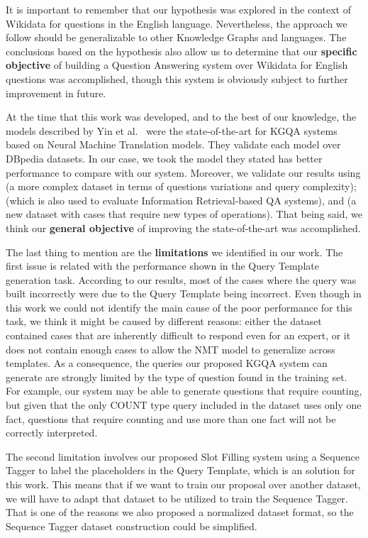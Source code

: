 It is important to remember that our hypothesis was explored in the context of Wikidata for questions 
in the English language. Nevertheless, the approach we follow should be generalizable to other 
Knowledge Graphs and languages. The conclusions based on the hypothesis also allow us to determine 
that our \textbf{specific objective} of building a Question Answering system over Wikidata for 
English questions was accomplished, though this system is obviously subject to further improvement 
in future.

At the time that this work was developed, and to the best of our knowledge, the models described by 
Yin et al.~\cite{nmt:nl-to-sparql-Yin19} were the state-of-the-art for KGQA systems based on Neural 
Machine Translation models. They validate each model over DBpedia datasets. In our case, we took the 
model they stated has better performance to compare with our system. Moreover, we validate our 
results using \LCQuADtwo{} (a more complex dataset in terms of questions variations and \SPARQL{} query 
complexity); \QALDseven{} (which is also used to evaluate Information Retrieval-based QA systems), and 
\WikiSPARQL{} (a new dataset with cases that require new types of operations). That being said, we 
think our \textbf{general objective} of improving the state-of-the-art was accomplished.

The last thing to mention are the \textbf{limitations} we identified in our work. The first issue is 
related with the performance shown in the Query Template generation task. According to our results, 
most of the cases where the \SPARQL{} query was built incorrectly were due to the Query Template being 
incorrect. Even though in this work we could not identify the main cause of the poor performance for 
this task, we think it might be caused by different reasons: either the \LCQuADtwo{} dataset contained 
cases that are inherently difficult to respond even for an \SPARQL{} expert, or it does not contain 
enough cases to allow the NMT model to generalize across templates. As a consequence, the \SPARQL{} 
queries our proposed KGQA system can generate are strongly limited by the type of question found in 
the \LCQuADtwo{} training set. For example, our system may be able to generate questions that require 
counting, but given that the only COUNT type query included in the \LCQuADtwo{} dataset uses only one 
fact, questions that require counting and use more than one fact will not be correctly interpreted.

The second limitation involves our proposed Slot Filling system using a Sequence Tagger to label the 
placeholders in the Query Template, which is an  solution for this work. This means that 
if we want to train our proposal over another dataset, we will have to adapt that dataset to be utilized 
to train the Sequence Tagger. That is one of the reasons we also proposed a normalized dataset format, 
so the Sequence Tagger dataset construction could be simplified.

